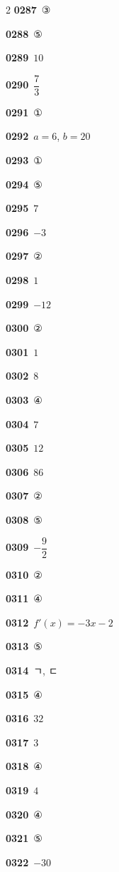 \documentclass[10pt,a4paper]{article}
\begin{document}
\begin{multicols}{2}
\noindent\textbf{0287}\ ③\par
\noindent\textbf{0288}\ ⑤\par
\noindent\textbf{0289}\ $10$\par
\noindent\textbf{0290}\ $\dfrac{7}{3}$\par
\noindent\textbf{0291}\ ①\par
\noindent\textbf{0292}\ $a=6$, $b=20$\par
\noindent\textbf{0293}\ ①\par
\noindent\textbf{0294}\ ⑤\par
\noindent\textbf{0295}\ $7$\par
\noindent\textbf{0296}\ $-3$\par
\noindent\textbf{0297}\ ②\par
\noindent\textbf{0298}\ $1$\par
\noindent\textbf{0299}\ $-12$\par
\noindent\textbf{0300}\ ②\par
\noindent\textbf{0301}\ $1$\par
\noindent\textbf{0302}\ $8$\par
\noindent\textbf{0303}\ ④\par
\noindent\textbf{0304}\ $7$\par
\noindent\textbf{0305}\ $12$\par
\noindent\textbf{0306}\ $86$\par
\noindent\textbf{0307}\ ②\par
\noindent\textbf{0308}\ ⑤\par
\noindent\textbf{0309}\ $-\dfrac{9}{2}$\par
\noindent\textbf{0310}\ ②\par
\noindent\textbf{0311}\ ④\par
\noindent\textbf{0312}\ $f'(x)=-3x-2$\par
\noindent\textbf{0313}\ ⑤\par
\noindent\textbf{0314}\ ㄱ, ㄷ\par
\noindent\textbf{0315}\ ④\par
\noindent\textbf{0316}\ $32$\par
\noindent\textbf{0317}\ $3$\par
\noindent\textbf{0318}\ ④\par
\noindent\textbf{0319}\ $4$\par
\noindent\textbf{0320}\ ④\par
\noindent\textbf{0321}\ ⑤\par
\noindent\textbf{0322}\ $-30$\par

\end{multicols}
\end{document}
